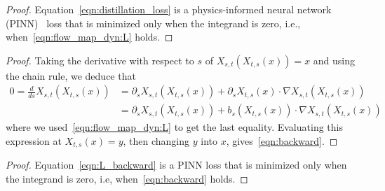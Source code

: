\lagdistill*
\begin{proof}
	Equation~\eqref{eqn:distillation_loss} is a physics-informed neural network (PINN)~\citep{raissi_physics-informed_2019} loss that is minimized only when the integrand is zero, i.e., when~\eqref{eqn:flow_map_dyn:L} holds.
\end{proof}

\euleq*
\begin{proof}
	Taking the derivative with respect to $s$ of  $X_{s,t}(X_{t,s}(x)) = x$ and using the chain rule, we deduce that
	\begin{equation}
		\label{eq:Eul:1}
		\begin{aligned}
			0 = \frac{d}{ds} X_{s,t}(X_{t,s}(x)) & =\partial_s X_{s,t}(X_{t,s}(x)) + \partial_s X_{t,s}(x) \cdot \nabla X_{s,t}(X_{t,s}(x)) \\
			                                     & =\partial_s X_{s,t}(X_{t,s}(x)) + b_s( X_{t,s}(x)) \cdot \nabla X_{s,t}(X_{t,s}(x))
		\end{aligned}
	\end{equation}
	where we used~\cref{eqn:flow_map_dyn:L} to get the last equality. Evaluating this expression at $X_{t,s}(x) = y$, then changing $y$ into $x$, gives~\cref{eqn:backward}.
\end{proof}

\euldistill*
\begin{proof}
	Equation~\eqref{eqn:L_backward} is a PINN loss that is minimized only when the integrand is zero, i.e, when~\eqref{eqn:backward} holds.
\end{proof}

